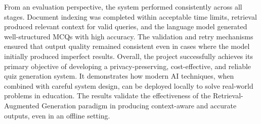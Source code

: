 \documentclass[12pt,a4paper]{report}
\begin{document}
From an evaluation perspective, the system performed consistently across all stages. Document indexing was completed within acceptable time limits, retrieval produced relevant context for valid queries, and the language model generated well-structured MCQs with high accuracy. The validation and retry mechanisms ensured that output quality remained consistent even in cases where the model initially produced imperfect results.
Overall, the project successfully achieves its primary objective of developing a privacy-preserving, cost-effective, and reliable quiz generation system. It demonstrates how modern AI techniques, when combined with careful system design, can be deployed locally to solve real-world problems in education. The results validate the effectiveness of the Retrieval-Augmented Generation paradigm in producing context-aware and accurate outputs, even in an offline setting.
\end{document}
